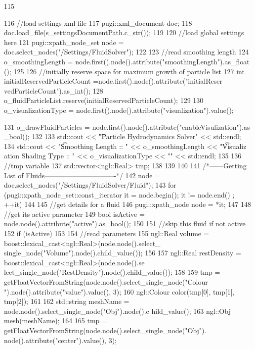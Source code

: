 \begin{DoxyCode}
115 {
116     //load settings xml file
117     pugi::xml_document doc;
118     doc.load_file(s_settingsDocumentPath.c_str());
119 
120     //load global settings here
121     pugi::xpath_node_set node = doc.select_nodes("/Settings/FluidSolver");
122 
123     //read smoothing length
124     o_smoothingLength = node.first().node().attribute("smoothingLength").as_float
      ();
125 
126     //initially reserve space for maximum growth of particle list
127     int initialReservedParticleCount =node.first().node().attribute("initialReser
      vedParticleCount").as_int();
128     o_fluidParticleList.reserve(initialReservedParticleCount);
129 
130     o_visualizationType = node.first().node().attribute("visualization").value();
      
131     o_drawFluidParticles = node.first().node().attribute("enableVisulization").as
      _bool();
132 
133     std::cout << "\n\t\tSmooth Particle Hydrodynamics Solver" << std::endl;
134     std::cout << "\n\t Smoothing Length :: " << o_smoothingLength << "\t Visualiz
      ation Shading Type :: " << o_visualizationType << "\n\n" << std::endl;
135 
136     //tmp variable
137     std::vector<ngl::Real> tmp;
138 
139 
140 
141     /*------Getting List of Fluids-------------------------------*/
142     node = doc.select_nodes("/Settings/FluidSolver/Fluid");
143     for (pugi::xpath_node_set::const_iterator it = node.begin(); it != node.end()
      ; ++it)
144     {
145         //get details for a fluid
146         pugi::xpath_node node = *it;
147 
148         //get its active parameter
149         bool isActive = node.node().attribute("active").as_bool();
150 
151         //skip this fluid if not active
152         if (isActive)
153         {
154             //read parameters
155             ngl::Real volume = boost::lexical_cast<ngl::Real>(node.node().select_
      single_node("Volume").node().child_value());
156 
157             ngl::Real restDensity = boost::lexical_cast<ngl::Real>(node.node().se
      lect_single_node("RestDensity").node().child_value());
158 
159             tmp = getFloatVectorFromString(node.node().select_single_node("Colour
      ").node().attribute("value").value(), 3);
160             ngl::Colour color(tmp[0], tmp[1], tmp[2]);
161 
162             std::string meshName = node.node().select_single_node("Obj").node().c
      hild_value();
163             ngl::Obj mesh(meshName);
164 
165             tmp = getFloatVectorFromString(node.node().select_single_node("Obj").
      node().attribute("center").value(), 3);
}}}
\end{DoxyCode}
